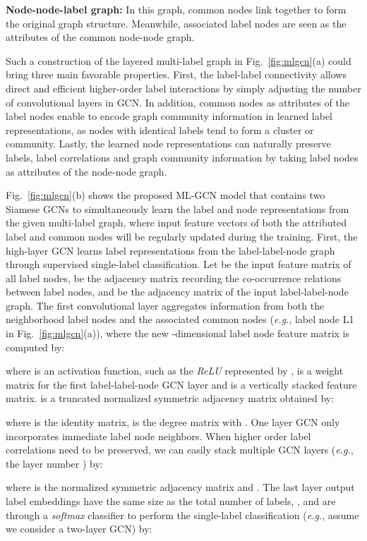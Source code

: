 \documentclass[conference]{IEEEtran}
\begin{document}
\noindent \textbf{Node-node-label graph:} In this graph, common nodes link together to form the original graph structure. Meanwhile, associated label nodes are seen as the attributes of the common node-node graph.

Such a construction of the layered multi-label graph in Fig.~\ref{fig:mlgcn}(a) could bring three main favorable properties. First, the label-label connectivity allows direct and efficient higher-order label interactions by simply adjusting the number of convolutional layers in GCN. In addition, common nodes as attributes of the label nodes enable to encode graph community information in learned label representations, as nodes with identical labels tend to form a cluster or community. Lastly, the learned node representations can naturally preserve labels, label correlations and graph community information by taking label nodes as attributes of the node-node graph.

Fig.~\ref{fig:mlgcn}(b) shows the proposed ML-GCN model that contains two Siamese GCNs to simultaneously learn the label and node representations from the given multi-label graph, where input feature vectors of both the attributed label and common nodes will be regularly updated during the training. First, the high-layer GCN learns label representations from the label-label-node graph through supervised single-label classification. Let  be the input feature matrix of all  label nodes,  be the  adjacency matrix recording the co-occurrence relations between label nodes, and  be the  adjacency matrix of the input label-label-node graph. The first convolutional layer aggregates information from both the neighborhood label nodes and the associated common nodes (\textit{e.g.}, label node L1 in Fig.~\ref{fig:mlgcn}(a)), where the new -dimensional label node feature matrix  is computed by:

where  is an activation function, such as the \textit{ReLU} represented by ,  is a weight matrix for the first label-label-node GCN layer and  is a vertically stacked  feature matrix.  is a truncated normalized symmetric adjacency matrix obtained by:

where  is the identity matrix,  is the degree matrix with . One layer GCN only incorporates immediate label node neighbors. When higher order label correlations need to be preserved, we can easily stack multiple GCN layers (\textit{e.g.}, the layer number ) by:

where  is the normalized symmetric adjacency matrix and . The last layer output label embeddings have the same size as the total number of labels, , and are through a \textit{softmax} classifier to perform the single-label classification (\textit{e.g.}, assume we consider a two-layer GCN) by:
\end{document}
